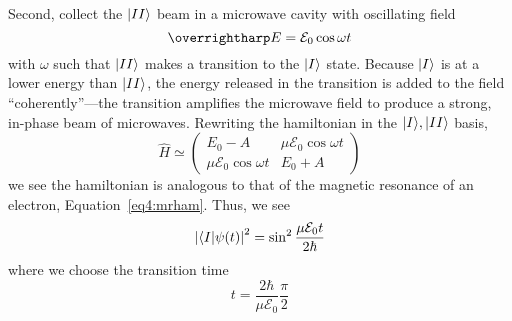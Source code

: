 Second, collect the \(\lvert II\rangle\) beam in a microwave cavity with oscillating field
\begin{equation}
	\vv{E}=\mathcal E_0\cos\omega t
\end{equation}
with \(\omega\) such that \(\lvert II\rangle\) makes a transition to the \(\lvert I\rangle\) state. Because \(\lvert I\rangle\) is at a lower energy than \(\lvert II\rangle\), the energy released in the transition is added to the field ``coherently''---the transition amplifies the microwave field to produce a strong, in-phase beam of microwaves.
Rewriting the hamiltonian in the \(\lvert I\rangle,\lvert II\rangle\) basis,
\begin{equation}
	\hat H \simeq \begin{pmatrix}
		E_0-A & \mu\mathcal E_0\cos\omega t\\ \mu\mathcal E_0 \cos\omega t & E_0 + A
	\end{pmatrix}
\end{equation}
we see the hamiltonian is analogous to that of the magnetic resonance of an electron, Equation~\ref{eq4:mrham}.
Thus, we see
\begin{equation}
	\left|\langle I\rvert{\psi(t)}\right|^2=\sin^2\frac{\mu\mathcal E_0 t }{2\hbar}
\end{equation}
where we choose the transition time
\begin{equation}
	t = \frac{2\hbar}{\mu\mathcal E_0}\frac{\pi}{2}
\end{equation}
